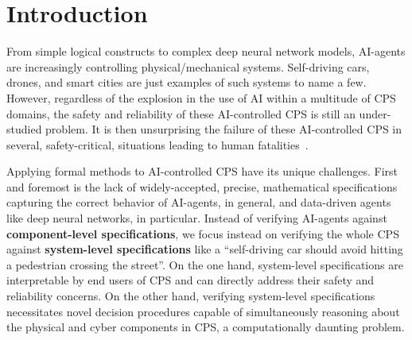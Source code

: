 \section{Introduction}
From simple logical constructs to complex deep neural network models, AI-agents are increasingly controlling physical/mechanical systems. Self-driving cars, drones, and smart cities are just examples of such systems to name a few. However, regardless of the explosion in the use of AI within a multitude of CPS domains, the safety and reliability of these AI-controlled CPS is still an under-studied problem. It is then unsurprising the failure of these AI-controlled CPS in several, safety-critical, situations leading to human fatalities~\cite{Accident1,Accident2,Accident3,Accident4,AccidentWiki}. 



Applying formal methods to AI-controlled CPS have its unique challenges. First and foremost is the lack of widely-accepted, precise, mathematical specifications capturing the correct behavior of AI-agents, in general, and data-driven agents like deep neural networks, in particular. Instead of verifying AI-agents against \textbf{component-level specifications}, we focus instead on verifying the whole CPS against \textbf{system-level specifications} like a ``self-driving car should avoid hitting a pedestrian crossing the street''. On the one hand, system-level specifications are interpretable by end users of CPS and can directly address their safety and reliability concerns. On the other hand, verifying system-level specifications necessitates novel decision procedures capable of simultaneously reasoning about the physical and cyber components in CPS, a computationally daunting problem. 


